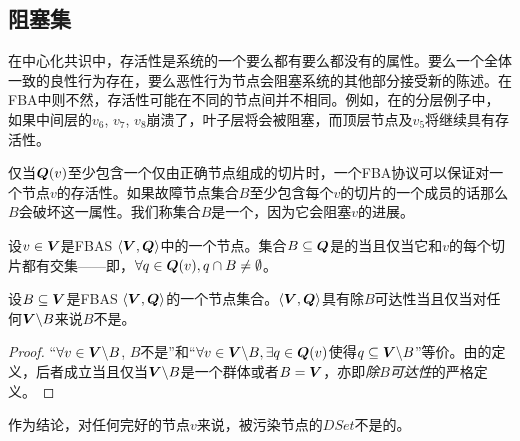 \subsection{阻塞集}
在中心化共识中，存活性是系统的一个要么都有要么都没有的属性。要么一个全体一致的良性行为{\quorum}存在，要么恶性行为节点会阻塞系统的其他部分接受新的陈述。在FBA中则不然，存活性可能在不同的节点间并不相同。例如，在的分层{\quorum}例子中，如果中间层的$v_6$, $v_7$, $v_8$崩溃了，叶子层将会被阻塞，而顶层节点及$v_5$将继续具有存活性。

仅当${\bm Q}(v)$至少包含一个仅由正确节点组成的{\quorum}切片时，一个FBA协议可以保证对一个节点$v$的存活性。如果故障节点集合$B$至少包含每个$v$的切片的一个成员的话那么$B$会破坏这一属性。我们称集合$B$是一个{\vblock}，因为它会阻塞$v$的进展。

\begin{definition}[{\vblock}]
        设$v\in {\bm V}$是FBAS $\langle{\bm V},{\bm Q}\rangle$中的一个节点。集合$B\subseteq {\bm Q}$是{\vblock}的当且仅当它和$v$的每个切片都有交集——即，$\forall q\in {\bm Q}(v),q\cap B\neq \emptyset$。
\end{definition}

\begin{theorem}\label{th7}
        设$B\subseteq {\bm V}$是FBAS $\langle{\bm V},{\bm Q}\rangle$的一个节点集合。$\langle{\bm V},{\bm Q}\rangle$具有除$B${\quorum}可达性当且仅当对任何${\bm V}\backslash B$来说$B$不是{\vblock}。
\end{theorem}

\begin{proof}
        ``$\forall v\in {\bm V}\backslash B$, $B$不是{\vblock}''和``$\forall v\in{\bm V}\backslash B, \exists q\in {\bm Q}(v)$使得$q\subseteq {\bm V}\backslash B$''等价。由{\quorum}的定义，后者成立当且仅当${\bm V}\backslash B$是一个群体或者$B={\bm V}$，亦即\textit{除$B${\quorum}可达性}的严格定义。
\end{proof}

作为结论，对任何完好的节点$v$来说，被污染节点的$DSet$不是{\vblock}的。